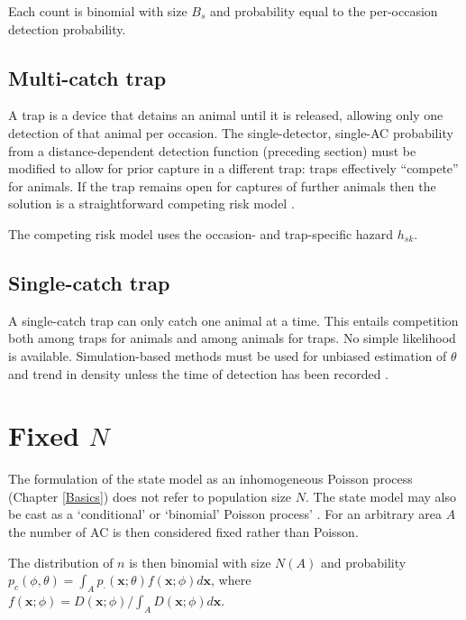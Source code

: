 \documentclass[
]{book}
\begin{document}
Each count is binomial with size \(B_s\) and probability equal to the per-occasion detection probability.

\subsection{Multi-catch trap}\label{multi-catch-trap}


A trap is a device that detains an animal until it is released, allowing only one detection of that animal per occasion. The single-detector, single-AC probability from a distance-dependent detection function (preceding section) must be modified to allow for prior capture in a different trap: traps effectively ``compete'' for animals. If the trap remains open for captures of further animals then the solution is a straightforward competing risk model \citep{be08}.

The competing risk model uses the occasion- and trap-specific hazard \(h_{sk}\).

\subsection{Single-catch trap}\label{single-catch-trap}


A single-catch trap can only catch one animal at a time. This entails competition
both among traps for animals and among animals for traps. No simple likelihood is available.
Simulation-based methods \citep{e04, Efford2023} must be used for unbiased estimation of
\(\theta\) and trend in density unless the time of detection has been recorded \citep{Distiller2015}.

\section{\texorpdfstring{Fixed \(N\)}{Fixed N}}\label{fixedN}


The formulation of the state model as an inhomogeneous Poisson process (Chapter \ref{Basics}) does not refer to population size \(N\). The state model may also be cast as a `conditional' or `binomial' Poisson process' \citep{illian08}. For an arbitrary area \(A\) the number of AC is then considered fixed rather than Poisson.

The distribution of \(n\) is then binomial with size \(N(A)\) and probability
\(p_c(\phi, \theta) = \int_A p_\cdot(\mathbf{x}; \theta) f(\mathbf{x}; \phi) d\mathbf{x}\), where \(f(\mathbf{x}; \phi) = D(\mathbf{x}; \phi) / \int_A D(\mathbf{x}; \phi) d\mathbf{x}\).
\end{document}
